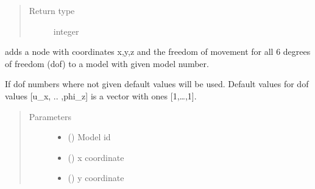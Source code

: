 \documentclass[letterpaper,10pt,english]{sphinxmanual}
\begin{document}
\begin{fulllineitems}
\begin{fulllineitems}
\begin{quote}
\begin{description}
\item[{Return type}] \leavevmode
integer

\end{description}\end{quote}

\end{fulllineitems}


\begin{fulllineitems}
\label{\detokenize{api:beamon.database.database.Database.add_node}}
adds a node with coordinates x,y,z and the freedom of movement for all 6 degrees of freedom (dof) to a model
with given model number.

If dof numbers where not given default values will be used.
Default values for dof values {[}u\_x, .. ,phi\_z{]} is a vector with ones {[}1,…,1{]}.
\begin{quote}\begin{description}
\item[{Parameters}] \leavevmode\begin{itemize}
\item {} 
 () \textendash{} Model id

\item {} 
 () \textendash{} x coordinate

\item {} 
 () \textendash{} y coordinate


\end{itemize}
\end{description}
\end{quote}
\end{fulllineitems}
\end{fulllineitems}
\end{document}
